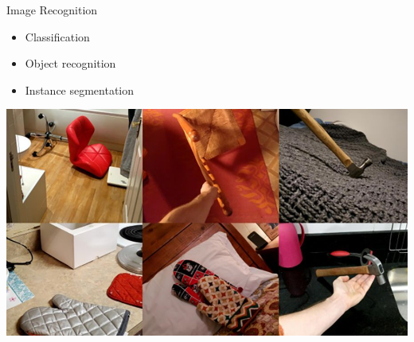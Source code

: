\documentclass{beamer}{}
\begin{document}
    \begin{frame} {Image Recognition}
        \begin{itemize}[<+->]
           \item Classification
           \item Object recognition
           \item Instance segmentation
        \end{itemize}
        \begin{center}
        \end{center}
    \end{frame}
    \begin{frame}[plain]
        \includegraphics[width=\textwidth]{img/chaos.png}
    \end{frame}
\end{document}
